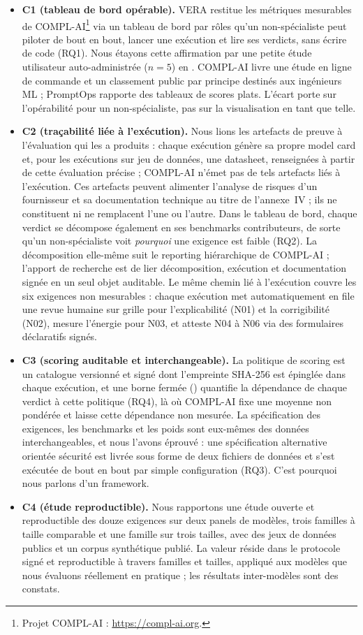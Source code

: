 \documentclass[10pt,conference]{IEEEtran}
\begin{document}
\begin{itemize}
  \item \textbf{C1 (tableau de bord opérable).} VERA restitue les métriques mesurables de COMPL-AI\footnote{Projet COMPL-AI : \url{https://compl-ai.org}.} via un tableau de bord par rôles qu'un non-spécialiste peut piloter de bout en bout, lancer une exécution et lire ses verdicts, sans écrire de code (RQ1). Nous étayons cette affirmation par une petite étude utilisateur auto-administrée ($n{=}5$) en . COMPL-AI livre une étude en ligne de commande et un classement public par principe destinés aux ingénieurs ML ; PromptOps rapporte des tableaux de scores plats. L'écart porte sur l'opérabilité pour un non-spécialiste, pas sur la visualisation en tant que telle.
  \item \textbf{C2 (traçabilité liée à l'exécution).} Nous lions les artefacts de preuve à l'évaluation qui les a produits : chaque exécution génère sa propre model card et, pour les exécutions sur jeu de données, une datasheet, renseignées à partir de cette évaluation précise ; COMPL-AI n'émet pas de tels artefacts liés à l'exécution. Ces artefacts peuvent alimenter l'analyse de risques d'un fournisseur et sa documentation technique au titre de l'annexe~IV ; ils ne constituent ni ne remplacent l'une ou l'autre. Dans le tableau de bord, chaque verdict se décompose également en ses benchmarks contributeurs, de sorte qu'un non-spécialiste voit \emph{pourquoi} une exigence est faible (RQ2). La décomposition elle-même suit le reporting hiérarchique de COMPL-AI ; l'apport de recherche est de lier décomposition, exécution et documentation signée en un seul objet auditable.
Le même chemin lié à l'exécution couvre les six exigences non mesurables : chaque exécution met automatiquement en file une revue humaine sur grille pour l'explicabilité (N01) et la corrigibilité (N02), mesure l'énergie pour N03, et atteste N04 à N06 via des formulaires déclaratifs signés.
  \item \textbf{C3 (scoring auditable et interchangeable).} La politique de scoring est un catalogue versionné et signé dont l'empreinte SHA-256 est épinglée dans chaque exécution, et une borne fermée () quantifie la dépendance de chaque verdict à cette politique (RQ4), là où COMPL-AI fixe une moyenne non pondérée et laisse cette dépendance non mesurée. La spécification des exigences, les benchmarks et les poids sont eux-mêmes des données interchangeables, et nous l'avons éprouvé : une spécification alternative orientée sécurité est livrée sous forme de deux fichiers de données et s'est exécutée de bout en bout par simple configuration (RQ3). C'est pourquoi nous parlons d'un framework.
  \item \textbf{C4 (étude reproductible).} Nous rapportons une étude ouverte et reproductible des douze exigences sur deux panels de modèles, trois familles à taille comparable et une famille sur trois tailles, avec des jeux de données publics et un corpus synthétique publié. La valeur réside dans le protocole signé et reproductible à travers familles et tailles, appliqué aux modèles que nous évaluons réellement en pratique ; les résultats inter-modèles sont des constats.
\end{itemize}
\end{document}
